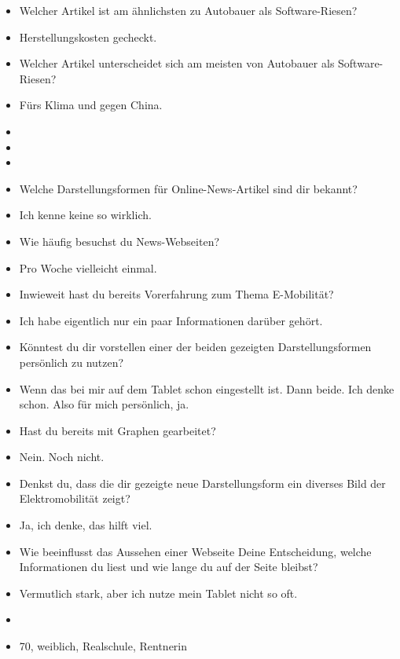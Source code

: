 {\begin{itemize}[]
            \item {} Welcher Artikel ist am ähnlichsten zu \flqq Autobauer als Software-Riesen\frqq{}?
            \item {} \flqq Herstellungskosten gecheckt\frqq{}.
            \item {} Welcher Artikel unterscheidet sich am meisten von \flqq Autobauer als Software-Riesen\frqq{}?
            \item {} \flqq Fürs Klima und gegen China\frqq{}.
            \item {}
            \item {}
            \item {}
            \item {} Welche Darstellungsformen für Online-News-Artikel sind dir bekannt?
            \item {} Ich kenne keine so wirklich.
            \item {} Wie häufig besuchst du News-Webseiten?
            \item {} Pro Woche vielleicht einmal.
            \item {} Inwieweit hast du bereits Vorerfahrung zum Thema E-Mobilität?
            \item {} Ich habe eigentlich nur ein paar Informationen darüber gehört.
            \item {} Könntest du dir vorstellen einer der beiden gezeigten Darstellungsformen persönlich zu nutzen?
            \item {} Wenn das bei mir auf dem Tablet schon eingestellt ist.
                  Dann beide.
                  Ich denke schon.
                  Also für mich persönlich, ja.
            \item {} Hast du bereits mit Graphen gearbeitet?
            \item {} Nein. Noch nicht.
            \item {} Denkst du, dass die dir gezeigte neue Darstellungsform ein diverses Bild der Elektromobilität zeigt?
            \item {} Ja, ich denke, das hilft viel.
            \item {} Wie beeinflusst das Aussehen einer Webseite Deine Entscheidung, welche Informationen du liest und wie lange du auf der Seite bleibst?
            \item {} Vermutlich stark, aber ich nutze mein Tablet nicht so oft.
            \item {}
            \item {} 70, weiblich, Realschule, Rentnerin
      \end{itemize}}
\nolinenumbers
